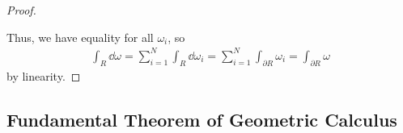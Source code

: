 \begin{proof}
\begin{itemize}
	\end{itemize}

	Thus, we have equality for all $ω_i$, so
	\begin{align}
		\int_R \dd ω = \sum_{i=1}^N \int_R \dd ω_i = \sum_{i=1}^N \int_{∂R} ω_i = \int_{∂R} ω
	\end{align}
	by linearity.
\end{proof}

\subsection{Fundamental Theorem of Geometric Calculus}